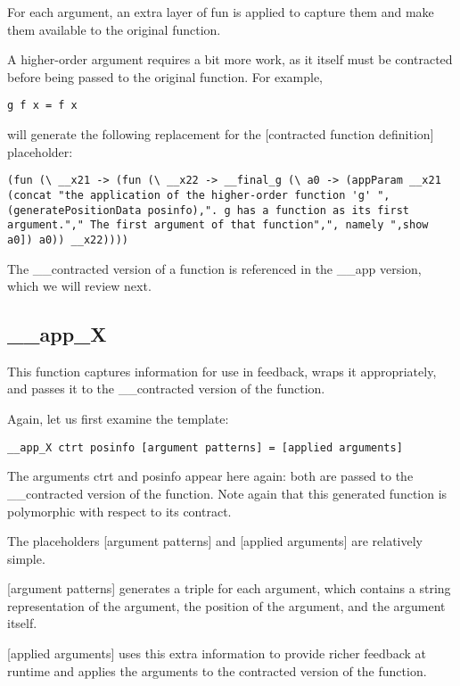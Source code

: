 \documentclass[10pt,a4paper]{article}
\begin{document}
For each argument, an extra layer of fun is applied to capture them and make them available to the original function.

A higher-order argument requires a bit more work, as it itself must be contracted before being passed to the original function.
For example,

\begin{lstlisting}
g f x = f x
\end{lstlisting}

will generate the following replacement for the [contracted function definition] placeholder:

\begin{lstlisting}
(fun (\ __x21 -> (fun (\ __x22 -> __final_g (\ a0 -> (appParam __x21 (concat "the application of the higher-order function 'g' ",(generatePositionData posinfo),". g has a function as its first argument."," The first argument of that function",", namely ",show a0]) a0)) __x22))))
\end{lstlisting}

The \_\_contracted version of a function is referenced in the \_\_app version, which we will review next.

\subsection{\_\_app\_X}

This function captures information for use in feedback, wraps it appropriately, and passes it to the \_\_contracted version of the function.

Again, let us first examine the template:

\begin{lstlisting}
__app_X ctrt posinfo [argument patterns] = [applied arguments]
\end{lstlisting}

The arguments ctrt and posinfo appear here again: both are passed to the \_\_contracted version of the function. Note again that this generated function is polymorphic with respect to its contract.

The placeholders [argument patterns] and [applied arguments] are relatively simple.

[argument patterns] generates a triple for each argument, which contains a string representation of the argument, the position of the argument, and the argument itself.

[applied arguments] uses this extra information to provide richer feedback at runtime and applies the arguments to the contracted version of the function.
\end{document}

